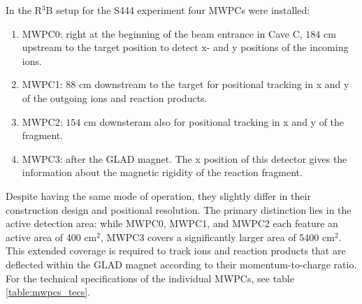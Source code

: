 In the R$^3$B setup for the S444 experiment four MWPCs were installed:\newline
\begin{enumerate}
\item MWPC0: right at the beginning of the beam entrance in Cave C, $184$ cm upstream to the target position to detect x- and y positions of the incoming ions.
\item MWPC1: $88$ cm downstream to the target for positional tracking in x and y of the outgoing ions and reaction products.
\item MWPC2: $154$ cm downsteram also for positional tracking in x and y of the fragment.
\item MWPC3: after the GLAD magnet. The x position of this detector gives the information about the magnetic rigidity of the reaction fragment.  %
\end{enumerate}
Despite having the same mode of operation, they slightly differ in their construction design and positional resolution. The primary distinction lies in the active detection area: while MWPC0, MWPC1, and MWPC2 each feature an active area of 400 cm$^{2}$, MWPC3 covers a significantly larger area of 5400 cm$^{2}$. This extended coverage is required to track ions and reaction products that are deflected within the GLAD magnet according to their momentum-to-charge ratio. For the technical specifications of the individual MWPCs, see table \ref{table:mwpcs_tecs}.
